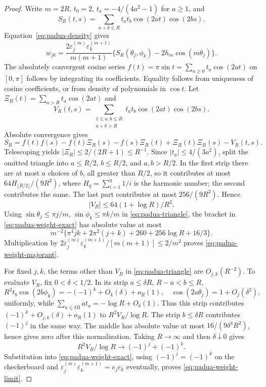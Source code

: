 \documentclass[preprint,12pt,a4paper]{elsarticle}
\theoremstyle{remark}
\begin{document}
\begin{proof}
Write $m=2R$, $t_0=2$, $t_a=-4/(4a^2-1)$ for $a\ge1$, and
\[
 S_R(t,s)=\sum_{a+b\le R}t_at_b\cos(2at)\cos(2bs).
\]
Equation~\eqref{eq:padua-density} gives
\begin{equation}\label{eq:padua-weight-exact}
 w_{jk}=\frac{2\varepsilon^{(m)}_j\varepsilon^{(m+1)}_k}{m(m+1)}
 \{S_R(\theta_j,\phi_k)-2h_m\cos(m\theta_j)\}.
\end{equation}
The absolutely convergent cosine series
$f(t)=\pi\sin t=\sum_{a\ge0}t_a\cos(2at)$ on $[0,\pi]$
follows by integrating its coefficients. Equality follows from uniqueness
of cosine coefficients, or from density of polynomials in $\cos t$.
Let $\Xi_R(t)=\sum_{a>R}t_a\cos(2at)$ and
\[
 V_R(t,s)=\sum_{\substack{1\le a,b\le R\\a+b>R}}
               t_at_b\cos(2at)\cos(2bs).
\]
Absolute convergence gives
\begin{equation}\label{eq:padua-triangle}
 S_R=f(t)f(s)-f(t)\Xi_R(s)-f(s)\Xi_R(t)+\Xi_R(t)\Xi_R(s)-V_R(t,s).
\end{equation}
Telescoping yields $|\Xi_R|\le2/(2R+1)\le R^{-1}$.
Since $|t_a|\le4/(3a^2)$, split the omitted triangle into $a\le R/2$,
$b\le R/2$, and $a,b>R/2$. In the first strip there are at most $a$
choices of $b$, all greater than $R/2$, so it contributes at most
$64H_{\lfloor R/2\rfloor}/(9R^2)$, where $H_q=\sum_{i=1}^q1/i$ is the harmonic number;
the second contributes the same.
The last part contributes at most $256/(9R^2)$. Hence
\[
 |V_R|\le64(1+\log R)/R^2.
\]
Using $\sin\theta_j\le\pi j/m$, $\sin\phi_k\le\pi k/m$ in
\eqref{eq:padua-triangle}, the bracket in
\eqref{eq:padua-weight-exact} has absolute value at most
\[
 m^{-2}\{\pi^4jk+2\pi^2(j+k)+260+256\log R+16/3\}.
\]
Multiplication by $2\varepsilon^{(m)}_j\varepsilon^{(m+1)}_k/[m(m+1)]\le2/m^2$
proves \eqref{eq:padua-weight-majorant}.

For fixed $j,k$, the terms other than $V_R$ in
\eqref{eq:padua-triangle} are $O_{j,k}(R^{-2})$. To evaluate $V_R$,
fix $0<\delta<1/2$. In its strip $a\le\delta R$, $R-a<b\le R$,
\[
 R^2t_b\cos(2b\phi_k)=-(-1)^k+O_k(\delta)+o_R(1),
 \quad \cos(2a\theta_j)=1+O_j(\delta^2),
\]
uniformly, while
$\sum_{a\le\delta R}a t_a=-\log R+O_\delta(1)$.
Thus this strip contributes $(-1)^k+O_{j,k}(\delta)+o_R(1)$
to $R^2V_R/\log R$. The strip $b\le\delta R$ contributes
$(-1)^j$ in the same way. The middle has absolute value at most
$16/(9\delta^4R^2)$, hence gives zero after this normalization.
Taking $R\to\infty$ and then $\delta\downarrow0$ gives
\[
 R^2V_R/\log R\longrightarrow(-1)^j+(-1)^k.
\]
Substitution into \eqref{eq:padua-weight-exact}, using
$(-1)^j=(-1)^k$ on the checkerboard and
$\varepsilon^{(m)}_j\varepsilon^{(m+1)}_k=e_je_k$ eventually, proves
\eqref{eq:padua-weight-limit}.
\end{proof}
\end{document}
